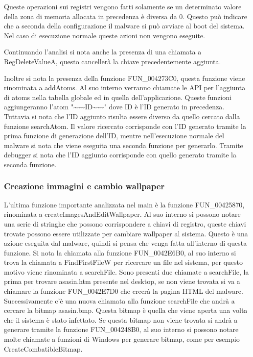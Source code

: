 \documentclass[a4paper,12pt]{article}
\begin{document}
Queste operazioni sui registri vengono fatti solamente se un determinato valore della zona di memoria allocata in precedenza è diversa da 0. Questo può indicare che a seconda della configurazione il malware si può avviare al boot del sistema. Nel caso di esecuzione normale queste azioni non vengono eseguite.

Continuando l'analisi si nota anche la presenza di una chiamata a RegDeleteValueA, questo cancellerà la chiave precedentemente aggiunta.

Inoltre si nota la presenza della funzione FUN\_004273C0, questa funzione viene rinominata a addAtoms. Al suo interno verranno chiamate le API per l'aggiunta di atoms nella tabella globale ed in quella dell'applicazione. Queste funzioni aggiungeranno l'atom "\textasciitilde\textasciitilde\textasciitilde ID\textasciitilde\textasciitilde\textasciitilde" dove ID è l'ID generato in precedenza. Tuttavia si nota che l'ID aggiunto risulta essere diverso da quello cercato dalla funzione searchAtom. Il valore ricercato corrisponde con l'ID generato tramite la prima funzione di generazione dell'ID, mentre nell'esecuzione normale del malware si nota che viene eseguita una seconda funzione per generarlo. Tramite debugger si nota che l'ID aggiunto corrisponde con quello generato tramite la seconda funzione.

\subsubsection{Creazione immagini e cambio wallpaper}
L'ultima funzione importante analizzata nel main è la funzione FUN\_00425870, rinominata a createImagesAndEditWallpaper. Al suo interno si possono notare una serie di stringhe che possono corrispondere a chiavi di registro, queste chiavi trovate possono essere utilizzate per cambiare wallpaper al sistema. Questo è una azione eseguita dal malware, quindi si pensa che venga fatta all'interno di questa funzione. Si nota la chiamata alla funzione FUN\_0042E6B0, al suo interno si trova la chiamata a FindFirstFileW per ricercare un file nel sistema, per questo motivo viene rinominata a searchFile. Sono presenti due chiamate a searchFile, la prima per trovare asasin.htm presente nel desktop, se non viene trovata si va a chiamare la funzione FUN\_0042E7D0 che creerà la pagina HTML del malware. Successivamente c'è una nuova chiamata alla funzione searchFile che andrà a cercare la bitmap asasin.bmp. Questa bitmap è quella che viene aperta una volta che il sistema è stato infettato. Se questa bitmap non viene trovata si andrà a generare tramite la funzione FUN\_004248B0, al suo interno si possono notare molte chiamate a funzioni di Windows per generare bitmap, come per esempio CreateCombatibleBitmap. 
\end{document}
